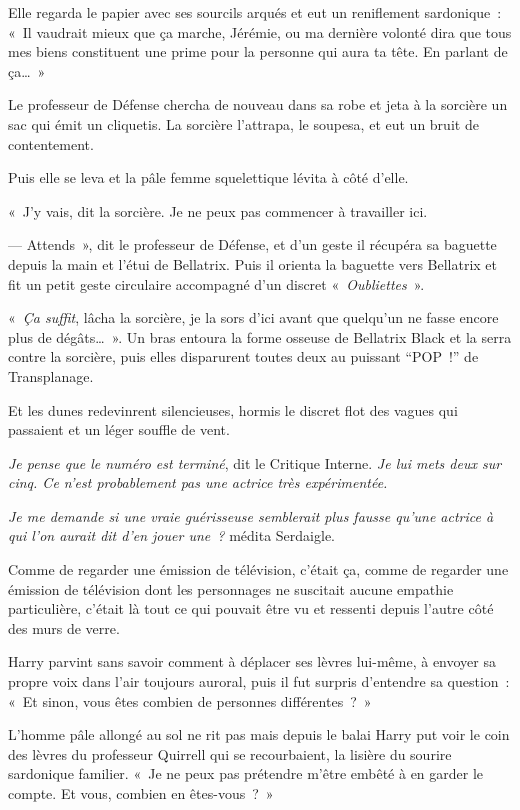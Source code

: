 Elle regarda le papier avec ses sourcils arqués et eut un reniflement sardonique~: «~Il vaudrait mieux que ça marche, Jérémie, ou ma dernière volonté dira que tous mes biens constituent une prime pour la personne qui aura ta tête. En parlant de ça…~»

Le professeur de Défense chercha de nouveau dans sa robe et jeta à la sorcière un sac qui émit un cliquetis. La sorcière l'attrapa, le soupesa, et eut un bruit de contentement.

Puis elle se leva et la pâle femme squelettique lévita à côté d'elle.

«~J'y vais, dit la sorcière. Je ne peux pas commencer à travailler ici.

--- Attends~», dit le professeur de Défense, et d'un geste il récupéra sa baguette depuis la main et l'étui de Bellatrix. Puis il orienta la baguette vers Bellatrix et fit un petit geste circulaire accompagné d'un discret «~\emph{Oubliettes}~».

«~\emph{Ça suffit}, lâcha la sorcière, je la sors d'ici avant que quelqu'un ne fasse encore plus de dégâts…~». Un bras entoura la forme osseuse de Bellatrix Black et la serra contre la sorcière, puis elles disparurent toutes deux au puissant “POP~!” de Transplanage.

Et les dunes redevinrent silencieuses, hormis le discret flot des vagues qui passaient et un léger souffle de vent.

\emph{Je pense que le numéro est terminé}, dit le Critique Interne. \emph{Je lui mets deux sur cinq. Ce n'est probablement pas une actrice très expérimentée.}

\emph{Je me demande si une vraie guérisseuse semblerait plus fausse qu'une actrice à qui l'on aurait dit d'en jouer une~?} médita Serdaigle.

Comme de regarder une émission de télévision, c'était ça, comme de regarder une émission de télévision dont les personnages ne suscitait aucune empathie particulière, c'était là tout ce qui pouvait être vu et ressenti depuis l'autre côté des murs de verre.

Harry parvint sans savoir comment à déplacer ses lèvres lui-même, à envoyer sa propre voix dans l'air toujours auroral, puis il fut surpris d'entendre sa question~: «~Et sinon, vous êtes combien de personnes différentes~?~»

L'homme pâle allongé au sol ne rit pas mais depuis le balai Harry put voir le coin des lèvres du professeur Quirrell qui se recourbaient, la lisière du sourire sardonique familier. «~Je ne peux pas prétendre m'être embêté à en garder le compte. Et vous, combien en êtes-vous~?~»

